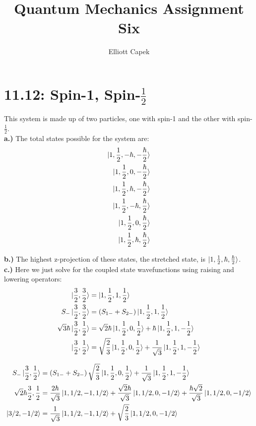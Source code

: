 \documentclass[10pt]{article} %
\title{Quantum Mechanics Assignment Six}
\author{Elliott Capek}
\begin{document}
\maketitle{}

\section{11.12: Spin-1, Spin-$\frac{1}{2}$}
This system is made up of two particles, one with spin-1 and the other with spin-$\frac{1}{2}$.\\

\textbf{a.)} The total states possible for the system are:\\

\begin{align*}
  \ket{1,\frac{1}{2},-\hbar,-\frac{\hbar}{2}}\\
  \ket{1,\frac{1}{2},0,-\frac{\hbar}{2}}\\
  \ket{1,\frac{1}{2},\hbar,-\frac{\hbar}{2}}\\
  \ket{1,\frac{1}{2},-\hbar,\frac{\hbar}{2}}\\
  \ket{1,\frac{1}{2},0,\frac{\hbar}{2}}\\
  \ket{1,\frac{1}{2},\hbar,\frac{\hbar}{2}}\\
\end{align*}

\textbf{b.)} The highest z-projection of these states, the stretched state, is
$\ket{1,\frac{1}{2},\hbar,\frac{\hbar}{2}}$.\\

\textbf{c.)} Here we just solve for the coupled state wavefunctions using raising
and lowering operators:\\

\begin{align*}
  \ket{\frac{3}{2},\frac{3}{2}} &= \ket{1,\frac{1}{2},1,\frac{1}{2}}\\
  S_-\ket{\frac{3}{2},\frac{3}{2}} &= \left(S_{1-}+S_{2-}\right)\ket{1,\frac{1}{2},1,\frac{1}{2}}\\
  \sqrt{3}\hbar\ket{\frac{3}{2},\frac{1}{2}} &= \sqrt{2}\hbar\ket{1,\frac{1}{2},0,\frac{1}{2}} + \hbar\ket{1,\frac{1}{2},1,-\frac{1}{2}}\\
  \ket{\frac{3}{2},\frac{1}{2}} &= \sqrt{\frac{2}{3}}\ket{1,\frac{1}{2},0,\frac{1}{2}} + \frac{1}{\sqrt{3}}\ket{1,\frac{1}{2},1,-\frac{1}{2}}\\
\end{align*}

\begin{align*}
  S_-\ket{\frac{3}{2},\frac{1}{2}} &=
  \left(S_{1-}+S_{2-}\right)\sqrt{\frac{2}{3}}\ket{1,\frac{1}{2},0,\frac{1}{2}} + \frac{1}{\sqrt{3}}\ket{1,\frac{1}{2},1,-\frac{1}{2}}\\
  \sqrt{2}\hbar{\frac{3}{2},\frac{1}{2}} &= \frac{2\hbar}{\sqrt{3}}\ket{1,1/2,-1,1/2}
  + \frac{\sqrt{2}\hbar}{\sqrt{3}}\ket{1,1/2,0,-1/2} + \frac{\hbar\sqrt{2}}{\sqrt{3}}\ket{1,1/2,0,-1/2}\\
  \ket{3/2,-1/2} &= \frac{1}{\sqrt{3}}\ket{1,1/2,-1,1/2} + \sqrt{\frac{2}{3}}\ket{1,1/2,0,-1/2}\\
\end{align*}
\end{document}
